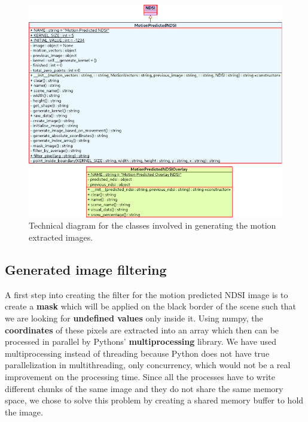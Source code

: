 \documentclass[12pt, a4paper]{report}
\begin{document}
	\begin{figure}[h!]
		\centering
		\includegraphics[scale=0.7]{../images/motion_created_diagram.png}
		\caption{Technical diagram for the classes involved in generating the motion extracted images.}
		\label{fig:motion_predicted_diagram}
	\end{figure}
	
	\subsection{Generated image filtering}
	\label{seq:filter}
	
	\par A first step into creating the filter for the motion predicted NDSI image is to create a \textbf{mask} which will be applied on the black border of the scene such that we are looking for \textbf{undefined values} only inside it. Using numpy, the \textbf{coordinates} of these pixels are extracted into an array which then can be processed in parallel by Pythons' \textbf{multiprocessing} library. We have used multiprocessing instead of threading because Python does not have true parallelization in multithreading, only concurrency, which would not be a real improvement on the processing time. Since all the processes have to write different chunks of the same image and they do not share the same memory space, we chose to solve this problem by creating a shared memory buffer to hold the image.
	
\end{document}
